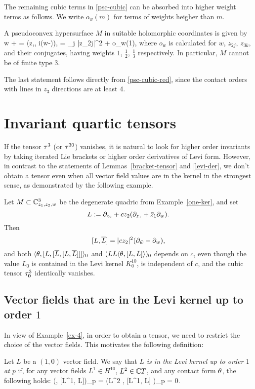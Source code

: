 \documentclass[12pt]{amsart}
\begin{document}
The remaining cubic terms in \eqref{psc-cubic} 
can be absorbed into higher weight terms as follows.
We write $o_w(m)$ for terms of weights heigher than $m$.

\bc{}
A pseudoconvex hypersurface $M$ in suitable holomorphic coordinates
is given by
\beq{}
w + \w = \phi(z,\z, i(w-\w)), 
\quad
\phi =
 \sum_j |z_{2j}|^2 + o_w(1),
\eeq
where $o_w$ is calculated for $w$, $z_{2j}$, $z_{3k}$, and their conjugates, 
having weights 
$1$, $\frac12$, $\frac13$ respectively.
In particular, $M$ cannot be of finite type $3$.
\ec

The last statement follows directly from \eqref{psc-cubic-red},
since the contact orders  with lines in $z_3$ directions
are at least $4$.



\section{Invariant quartic tensors}
If the tensor $\tau^3$ (or $\tau^{30}$) vanishes,
it is natural to look for higher order invariants by taking iterated Lie brackets
or higher order derivatives of Levi form.
However, 
in contrast to the statements of Lemmas~\ref{bracket-tensor} 
and \ref{levi-der},
we don't obtain a tensor
even when all vector field values are in the kernel in the strongest sense,
as demonstrated by the following example.

\be{}
Let $M\subset {\mathbb{C}}^3_{z_1, z_2, w}$ be 
the degenerate quadric 
from Example~\ref{one-ker},
and set 
$$
	L:=\partial_{z_2} +  c z_2(\partial_{z_1} + {\bar z}_1\partial_w).
$$
Then 
$$
	[L, \overline{L}] = |c z_2|^2 (\partial_{{\bar w}} - \partial_w),
$$
and
both $\langle \theta, [L, [\overline{L}, [L, \overline{L}]]] \rangle_0$
and $(L\bar L \langle \theta,  [L, \bar L] \rangle)_0 $
depends on $c$, even though
the value $L_0$ is contained in the Levi kernel $K_0^{10}$,
is independent of $c$,
and the cubic tensor $\tau^3_0$ identically vanishes.
\ee


\subsection{Vector fields that are in the Levi kernel up to order $1$}
In view of Example~\ref{ex-4},
in order to obtain a tensor, we need to restrict
the choice of the vector fields.
This motivates the following definition:

\bd{}
Let $L$ be a $(1,0)$ vector field.
We say that 
{\em $L$ is in the Levi kernel up to
order $1$ at $p$} if,
for any vector fields $L^1\in H^{10}$, $L^2\in {\mathbb{C}} T$,
and any contact form $\theta$, the following holds:
\beq{}
	(\la \th, [L^1, \1L]\ra )_p
	= (L^2 \la \th, [L^1, \1L] \ra)_p 
	= 0.
\eeq
\end{document}
